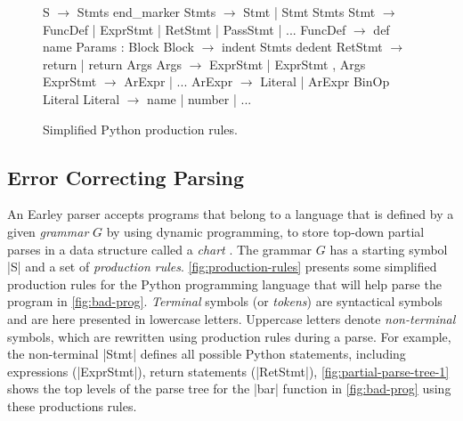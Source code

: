 \begin{figure}[t]
\begin{minipage}[c]{0.47\linewidth}
\begin{rules}
S        $\rightarrow$ Stmts end_marker
Stmts    $\rightarrow$ Stmt \n | Stmt \n Stmts
Stmt     $\rightarrow$ FuncDef | ExprStmt
          | RetStmt | PassStmt | ...
FuncDef  $\rightarrow$ def name Params : Block
Block    $\rightarrow$ \n indent Stmts dedent
RetStmt  $\rightarrow$ return | return Args
Args     $\rightarrow$ ExprStmt | ExprStmt , Args
ExprStmt $\rightarrow$ ArExpr | ...
ArExpr   $\rightarrow$ Literal
          | ArExpr BinOp Literal
Literal  $\rightarrow$ name | number | ...
\end{rules}
\caption{Simplified Python production rules.}
\label{fig:production-rules}
\end{minipage}
\hspace{0.02\linewidth}%
\begin{minipage}[c]{0.50\linewidth}
\hspace*{-0.06\linewidth}%

\end{minipage}
\end{figure}

\subsection{Error Correcting Parsing}
\label{sec:overview:ec-parsing}

%
An Earley parser accepts programs that belong to a
language that is defined by a given \emph{grammar} $G$
by using dynamic programming, to store top-down partial
parses in a data structure called a \emph{chart} \citep{Earley_1970}.
The grammar $G$ has a starting symbol |S| and a set of \emph{production rules}.
\autoref{fig:production-rules} presents some simplified production rules for the
Python programming language that will help parse the program in
\autoref{fig:bad-prog}. \emph{Terminal} symbols (or \emph{tokens}) are
syntactical symbols and are here presented in lowercase
letters. Uppercase letters denote \emph{non-terminal} symbols, which are
rewritten using production rules during a parse.
For example, the non-terminal |Stmt| defines all
possible Python statements, including expressions (|ExprStmt|), return statements
(|RetStmt|), \etc \autoref{fig:partial-parse-tree-1} shows the top levels of
the parse tree for the |bar| function in \autoref{fig:bad-prog} using these
productions rules.

